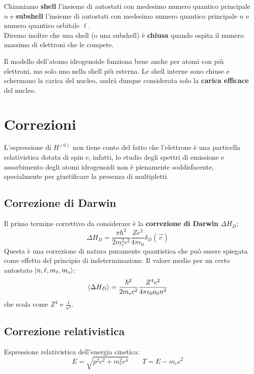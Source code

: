 \begin{definition}
    Chiamiamo \textbf{shell} l'insieme di autostati con medesimo numero quantico principale \(n\) e \textbf{subshell} l'insieme di autostati con medesimo numero quantico principale \(n\) e numero quantico orbitale \(\ell\).\\
    Diremo inoltre che una shell (o una subshell) è \textbf{chiusa} quando ospita il numero massimo di elettroni che le compete.
\end{definition}
Il modello dell'atomo idrogenoide funziona bene anche per atomi con più elettroni, ma solo uno nella shell più esterna. 
Le shell interne sono chiuse e schermano la carica del nucleo, andrà dunque considerata solo la \textbf{carica efficace} del nucleo.

\section{Correzioni}
L'espressione di \(H^{(0)}\) non tiene conto del fatto che l'elettrone è una particella relativistica dotata di spin e, infatti,
lo studio degli spettri di emissione e assorbimento degli atomi idrogenoidi non è pienamente soddisfacente,
specialmente per giustificare la presenza di multipletti.

\subsection{Correzione di Darwin}
Il primo termine correttivo da considerare è la \textbf{correzione di Darwin} \(\Delta H_D\):
\begin{equation}
    \Delta H_D = \frac{\pi \hbar^2}{2m_e^2 c^2} \frac{Ze^2}{4\pi \epsilon_0}\delta_D(\vec{r})
\end{equation} 
Questa è una correzione di natura puramente quantistica che può essere spiegata come effetto del principio di indeterminazione.
Il valore medio per un certo autostato \(\ket{n,\ell,m_\ell, m_s}\):
\begin{equation}
    \expval{\Delta H_D} = \frac{\hbar^2}{2m_e c^2}  \frac{Z^4e^2}{4\pi \epsilon_0 a_0n^3}
\end{equation}
che scala come \(Z^4\) e \(\frac{1}{n^3}\). 

\subsection{Correzione relativistica}
Espressione relativistica dell'energia cinetica:
\begin{equation}
    E = \sqrt{p^2 c^2 + m_e^2 c^4} \qquad T = E - m_e c^2
\end{equation}

